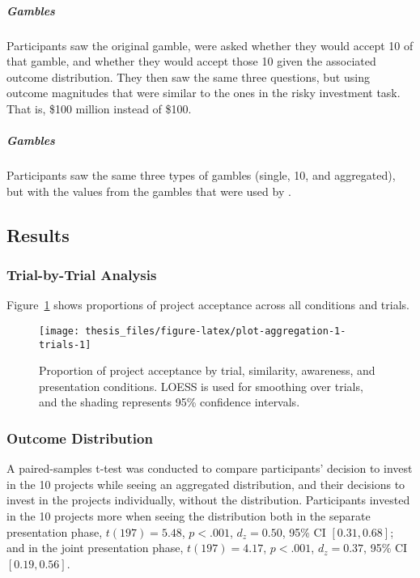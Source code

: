\documentclass[a4paper, nobind]{templates/ociamthesis}
\theoremstyle{definition}
\theoremstyle{definition}
\theoremstyle{definition}
\theoremstyle{definition}
\theoremstyle{remark}
\begin{document}
\subparagraph{\texorpdfstring{\textcite{samuelson1963} Gambles}{Samuelson (1963) Gambles}}

Participants saw the original \textcite{samuelson1963} gamble, were asked whether they
would accept 10 of that gamble, and whether they would accept those 10 given the
associated outcome distribution. They then saw the same three questions, but
using outcome magnitudes that were similar to the ones in the risky investment
task. That is, \$100 million instead of \$100.

\subparagraph{\texorpdfstring{\textcite{redelmeier1992} Gambles}{Redelmeier and Tversky (1992) Gambles}}

Participants saw the same three types of gambles (single, 10, and aggregated),
but with the values from the gambles that were used by \textcite{redelmeier1992}.

\hypertarget{results-aggregation-1-appendix}{%
\subsection{Results}\label{results-aggregation-1-appendix}}

\hypertarget{trial-by-trial-aggregation-1}{%
\subsubsection{Trial-by-Trial Analysis}\label{trial-by-trial-aggregation-1}}

Figure~\ref{fig:plot-aggregation-1-trials} shows proportions of project
acceptance across all conditions and trials.



\begin{figure}
\texttt{[image: thesis\_files/figure-latex/plot-aggregation-1-trials-1]} \caption{Proportion of project acceptance by trial, similarity, awareness, and presentation conditions. LOESS is used for smoothing over trials, and the shading represents 95\% confidence intervals.}\label{fig:plot-aggregation-1-trials}
\end{figure}

\hypertarget{outcome-distribution-aggregation-1}{%
\subsubsection{Outcome Distribution}\label{outcome-distribution-aggregation-1}}

A paired-samples t-test was conducted to compare participants' decision to
invest in the 10 projects while seeing an aggregated distribution, and their
decisions to invest in the projects individually, without the distribution.
Participants invested in the 10 projects more when seeing the distribution both
in the separate presentation phase,
\(t(197) = 5.48\), \(p < .001\), \(d_z = 0.50\), 95\% CI \([0.31, 0.68]\); and in the joint
presentation phase, \(t(197) = 4.17\), \(p < .001\), \(d_z = 0.37\), 95\% CI \([0.19, 0.56]\).
\end{document}
